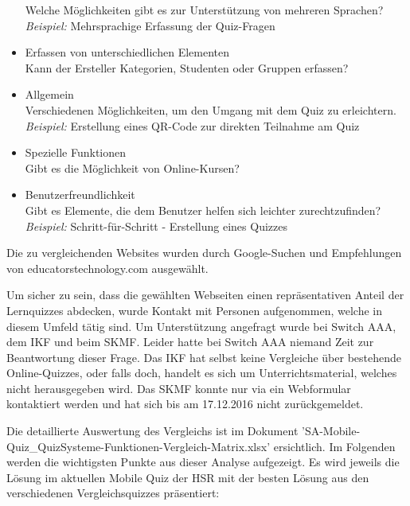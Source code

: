 \begin{itemize}
		Welche Möglichkeiten gibt es zur Unterstützung von mehreren Sprachen? \\
		\textit{Beispiel:} Mehrsprachige Erfassung der Quiz-Fragen
		\item Erfassen von unterschiedlichen Elementen \\
		Kann der Ersteller Kategorien, Studenten oder Gruppen erfassen?
		\item Allgemein \\
		Verschiedenen Möglichkeiten, um den Umgang mit dem Quiz zu erleichtern. \\
		\textit{Beispiel:} Erstellung eines QR-Code zur direkten Teilnahme am Quiz
		\item Spezielle Funktionen \\
		Gibt es die Möglichkeit von Online-Kursen?
		\item Benutzerfreundlichkeit \\
		Gibt es Elemente, die dem Benutzer helfen sich leichter zurechtzufinden? \\
		\textit{Beispiel:} Schritt-für-Schritt - Erstellung eines Quizzes
	\end{itemize}
	
	\bigskip
	
	Die zu vergleichenden Websites wurden durch Google-Suchen und Empfehlungen von educatorstechnology.com \cite{educatorstechnology.com} ausgewählt.
		
	Um sicher zu sein, dass die gewählten Webseiten einen repräsentativen Anteil der Lernquizzes abdecken, wurde Kontakt mit Personen aufgenommen, welche in diesem Umfeld tätig sind. Um Unterstützung angefragt wurde bei Switch AAA, dem \acrfull{IKF} und beim \acrfull{SKMF}.
	Leider hatte bei Switch AAA niemand Zeit zur Beantwortung dieser Frage. Das \acrshort{IKF} hat selbst keine Vergleiche über bestehende Online-Quizzes, oder falls doch, handelt es sich um Unterrichtsmaterial, welches nicht herausgegeben wird. Das \acrshort{SKMF} konnte nur via ein Webformular kontaktiert werden und hat sich bis am 17.12.2016 nicht zurückgemeldet.
	
	\bigskip
	
	Die detaillierte Auswertung des Vergleichs ist im Dokument 'SA-Mobile-Quiz\_QuizSysteme-Funktionen-Vergleich-Matrix.xlsx' ersichtlich. Im Folgenden werden die wichtigsten Punkte aus dieser Analyse aufgezeigt. Es wird jeweils die Lösung im aktuellen Mobile Quiz der HSR mit der besten Lösung aus den verschiedenen Vergleichsquizzes präsentiert:
	
